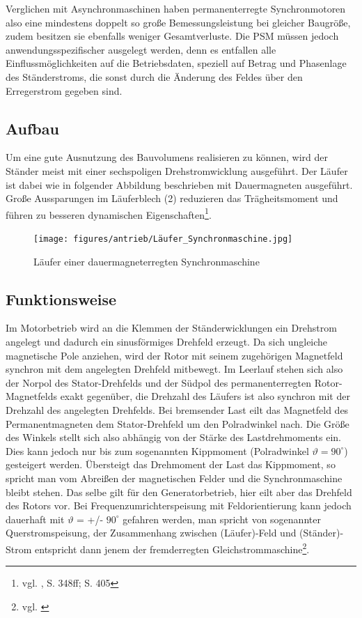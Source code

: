 Verglichen mit Asynchronmaschinen haben permanenterregte Synchronmotoren also eine mindestens doppelt so große Bemessungsleistung bei gleicher Baugröße, zudem besitzen sie ebenfalls weniger Gesamtverluste. Die PSM müssen jedoch anwendungsspezifischer ausgelegt werden, denn es entfallen alle Einflussmöglichkeiten auf die Betriebsdaten, speziell auf Betrag und Phasenlage des Ständerstroms, die sonst durch die Änderung des Feldes über den Erregerstrom gegeben sind.

\subsection{Aufbau}
Um eine gute Ausnutzung des Bauvolumens realisieren zu können, wird der Ständer meist mit einer sechspoligen Drehstromwicklung ausgeführt. Der Läufer ist dabei wie in folgender Abbildung beschrieben mit Dauermagneten ausgeführt. Große Aussparungen im Läuferblech (2) reduzieren das Trägheitsmoment und führen zu besseren dynamischen Eigenschaften\footnote{vgl. \cite{Fischer}, S. 348ff; S. 405}.
\\[3mm]
\begin{figure}[H]
	\begin{center}
		\texttt{[image: figures/antrieb/Läufer\_Synchronmaschine.jpg]}
		\caption{Läufer einer dauermagneterregten Synchronmaschine\cite{Fischer}}
	\end{center}
\end{figure}

\subsection{Funktionsweise}
Im Motorbetrieb wird an die Klemmen der Ständerwicklungen ein Drehstrom angelegt und dadurch ein sinusförmiges Drehfeld erzeugt. Da sich ungleiche magnetische Pole anziehen, wird der Rotor mit seinem zugehörigen Magnetfeld synchron mit dem angelegten Drehfeld mitbewegt. Im Leerlauf stehen sich also der Norpol des Stator-Drehfelds und der Südpol des permanenterregten Rotor-Magnetfelds exakt gegenüber, die Drehzahl des Läufers ist also synchron mit der Drehzahl des angelegten Drehfelds. Bei bremsender Last eilt das Magnetfeld des Permanentmagneten dem Stator-Drehfeld um den Polradwinkel nach. Die Größe des Winkels stellt sich also abhängig von der Stärke des Lastdrehmoments ein. Dies kann jedoch nur bis zum sogenannten Kippmoment (Polradwinkel $\vartheta = 90^\circ$) gesteigert werden. Übersteigt das Drehmoment der Last das Kippmoment, so spricht man vom \glqq Abreißen\grqq{} der magnetischen Felder und die Synchronmaschine bleibt stehen. Das selbe gilt für den Generatorbetrieb, hier eilt aber das Drehfeld des Rotors vor. Bei Frequenzumrichterspeisung mit Feldorientierung kann jedoch dauerhaft mit $\vartheta$ = +/- $90^\circ$ gefahren werden, man spricht von sogenannter Querstromspeisung, der Zusammenhang zwischen (Läufer)-Feld und (Ständer)-Strom entspricht dann jenem der fremderregten Gleichstrommaschine\footnote{vgl. \cite{Synchronmaschine}}.

